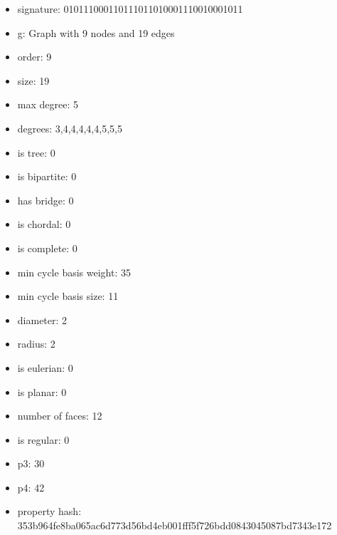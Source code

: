 \newpage
\begin{figure}
\end{figure}
\begin{itemize}
\item signature: 010111000110111011010001110010001011
\item g: Graph with 9 nodes and 19 edges
\item order: 9
\item size: 19
\item max degree: 5
\item degrees: 3,4,4,4,4,4,5,5,5
\item is tree: 0
\item is bipartite: 0
\item has bridge: 0
\item is chordal: 0
\item is complete: 0
\item min cycle basis weight: 35
\item min cycle basis size: 11
\item diameter: 2
\item radius: 2
\item is eulerian: 0
\item is planar: 0
\item number of faces: 12
\item is regular: 0
\item p3: 30
\item p4: 42
\item property hash: 353b964fe8ba065ac6d773d56bd4eb001fff5f726bdd0843045087bd7343e172
\end{itemize}
